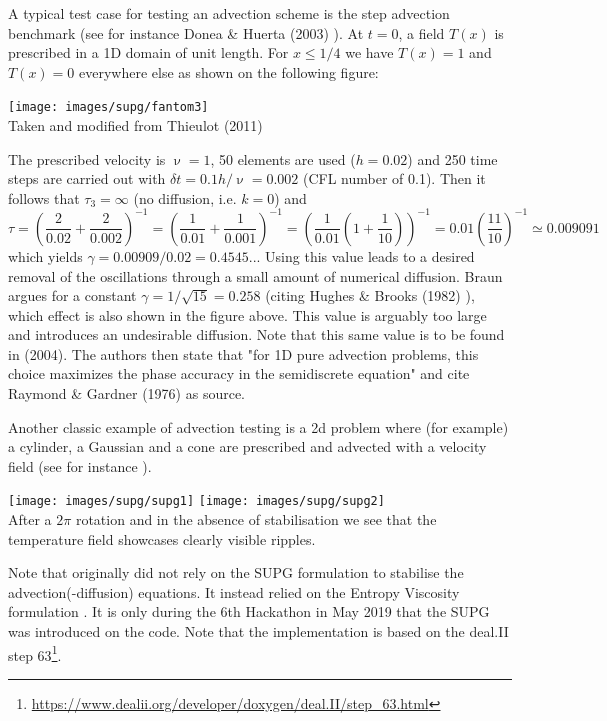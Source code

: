 A typical test case for testing an advection scheme is the step advection benchmark 
(see for instance Donea \& Huerta (2003) \cite{dohu03}). At $t=0$, 
a field $T(x)$ is prescribed in a 1D domain of unit length. For $x\le 1/4$ we have $T(x)=1$ and 
$T(x)=0$ everywhere else as shown on the following figure:
\begin{center}
\texttt{[image: images/supg/fantom3]}\\
{\captionfont Taken and modified from Thieulot (2011) \cite{thie11}}
\end{center}
The prescribed velocity is $\upnu=1$, 50 elements are used ($h=0.02$) and 250 time steps are 
carried out with $\delta t=0.1h/\upnu=0.002$ (CFL number of 0.1).
Then it follows that $\tau_3=\infty$ (no diffusion, i.e. $k=0$) and 
\[
\tau
= \left(\frac{2}{0.02} + \frac{2}{0.002} \right)^{-1}
= \left(\frac{1}{0.01} + \frac{1}{0.001} \right)^{-1}
= \left(\frac{1}{0.01} (1 + \frac{1}{10})  \right)^{-1}
= 0.01 \left(\frac{11}{10}  \right)^{-1}
\simeq 0.009091
\]
which yields $\gamma = 0.00909/0.02=0.4545...$
Using this value leads to a desired removal of the oscillations through a small
amount of numerical diffusion. Braun \cite{brau03} argues for a constant
$\gamma=1/\sqrt{15}=0.258$ (citing Hughes \& Brooks (1982) \cite{hubr82}), 
which effect is also shown in the figure above. This 
value is arguably too large and introduces an undesirable diffusion. Note that this same value is 
to be found in \textcite{bogs04} (2004). The authors then state that 
"for 1D pure advection problems, this choice maximizes the phase accuracy in the semidiscrete
equation" and cite Raymond \& Gardner (1976) \cite{raga76} as source. 

Another classic example of advection testing is a 2d problem where (for example) a cylinder, a Gaussian 
and a cone are prescribed and advected with a velocity field (see for instance \cite{dohu03}). 

\begin{center}
\texttt{[image: images/supg/supg1]}
\texttt{[image: images/supg/supg2]}\\
{\captionfont After a $2\pi$ rotation and in the absence of stabilisation we see that the temperature field
showcases clearly visible ripples.}
\end{center}

\begin{remark}
Note that \aspect{} originally did not rely on the SUPG formulation to stabilise the 
advection(-diffusion) equations\cite{krhb12}. It instead relied on the Entropy Viscosity
formulation \cite{gupp10,gupp11}.
It is only during the 6th Hackathon in May 2019 that the SUPG was introduced on the code.
Note that the \aspect{} implementation is based on the deal.II step 
63\footnote{\url{https://www.dealii.org/developer/doxygen/deal.II/step_63.html}}.
\end{remark}


